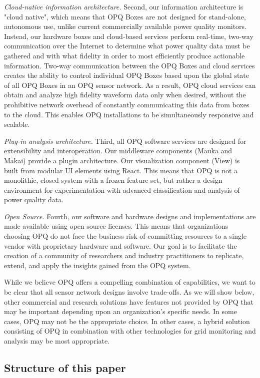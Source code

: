 {\em Cloud-native information architecture.} Second, our information architecture is "cloud native", which means that OPQ Boxes are not designed for stand-alone, autonomous use, unlike current commercially available power quality monitors. Instead, our hardware boxes and cloud-based services perform real-time, two-way communication over the Internet to determine what power quality data must be gathered and with what fidelity in order to most efficiently produce actionable information. Two-way communication between the OPQ Boxes and cloud services creates the ability to control individual OPQ Boxes based upon the global state of all OPQ Boxes in an OPQ sensor network. As a result, OPQ cloud services can obtain and analyze high fidelity waveform data only when desired, without the prohibitive network overhead of constantly communicating this data from boxes to the cloud. This enables OPQ installations to be simultaneously responsive and scalable.

{\em Plug-in analysis architecture.} Third, all OPQ software services are designed for extensibility and interoperation. Our middleware components (Mauka and Makai) provide a plugin architecture. Our visualization component (View) is built from modular UI elements using React.  This means that OPQ is not a monolithic, closed system with a frozen feature set, but rather a design environment for experimentation with advanced classification and analysis of power quality data.

{\em Open Source.} Fourth, our software and hardware designs and implementations are made available using open source licenses. This means that organizations choosing OPQ do not face the business risk of committing resources to a single vendor with proprietary hardware and software. Our goal is to facilitate the creation of a community of researchers and industry practitioners to replicate, extend, and apply the insights gained from the OPQ system.

While we believe OPQ offers a compelling combination of capabilities, we want to be clear that all sensor network designs involve trade-offs. As we will show below, other commercial and research solutions have features not provided by OPQ that may be important depending upon an organization's specific needs. In some cases, OPQ may not be the appropriate choice. In other cases, a hybrid solution consisting of OPQ in combination with other technologies for grid monitoring and analysis may be most appropriate.

\subsection{Structure of this paper}

